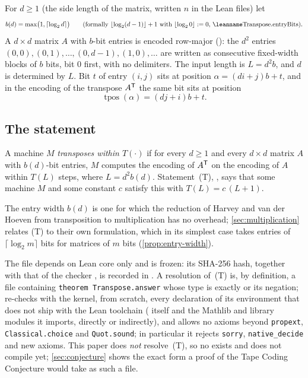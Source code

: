 For $d\ge1$ (the side length of the matrix, written $n$ in the Lean files) let
\[
  b(d)=\max\bigl(1,\lceil\log_2 d\rceil\bigr)
  \qquad\text{(formally } \lfloor\log_2(d-1)\rfloor+1\text{ with }\lfloor\log_2 0\rfloor:=0\text{, \lean{Transpose.entryBits})}.
\]
A $d\times d$ matrix $A$ with $b$-bit entries is encoded row-major
(): the $d^2$ entries $(0,0),(0,1),\dots,(0,d-1),(1,0),\dots$ are written
as consecutive fixed-width blocks of $b$ bits, bit $0$ first, with no delimiters. The input length
is $L=d^2b$, and $d$ is determined by $L$. Bit $t$ of entry $(i,j)$ sits at position
$\alpha=(di+j)b+t$, and in the encoding of the transpose $A^{\mathsf{T}}$ the same bit sits at position
\[
  \operatorname{tpos}(\alpha)=(dj+i)b+t .
\]

\subsection{The statement}

\begin{definition}[Statement (T)]\label{def:T}
A machine $M$ \emph{transposes within $T(\cdot)$} if for every $d\ge1$ and every $d\times d$
matrix $A$ with $b(d)$-bit entries, $M$ computes the encoding of $A^{\mathsf{T}}$ on the encoding of $A$
within $T(L)$ steps, where $L=d^2b(d)$. Statement~(T), ,
says that some machine $M$ and some constant $c$ satisfy this with $T(L)=c\,(L+1)$.
\end{definition}

The entry width $b(d)$ is one for which the reduction of Harvey and van der Hoeven from transposition to
multiplication has no overhead; \cref{sec:multiplication} relates (T) to their own formulation, which in its simplest case takes entries of $\lceil\log_2m\rceil$ bits for matrices of $m$ bits (\cref{prop:entry-width}).

The file  depends on Lean core only and is frozen: its SHA-256
hash, together with that of the checker , is recorded in
. A resolution of~(T) is, by definition, a file
 containing \texttt{theorem Transpose.answer} whose type is exactly
 or its negation;  re-checks with the kernel, from scratch, every declaration of its environment
that does not ship with the Lean toolchain ( itself and the Mathlib and library modules it imports, directly or indirectly), and allows no axioms beyond
\texttt{propext}, \texttt{Classical.choice} and \texttt{Quot.sound}; in particular it rejects
\texttt{sorry}, \texttt{native\_decide} and new axioms. This paper does \emph{not} resolve~(T), so no  exists and
 does not compile yet; \cref{sec:conjecture} shows the exact form a proof of
the Tape Coding Conjecture would take as such a file.

